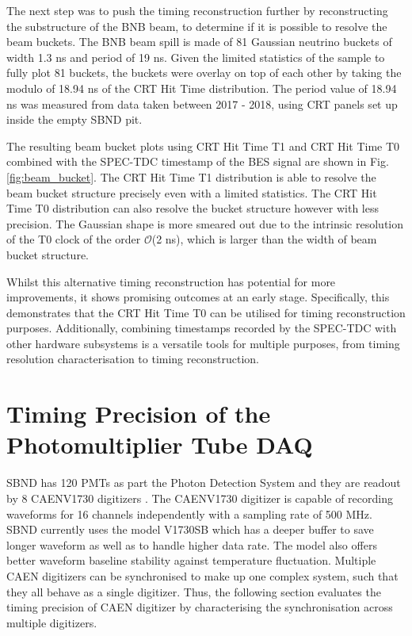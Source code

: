 The next step was to push the timing reconstruction further by reconstructing the substructure of the BNB beam, to determine if it is possible to resolve the beam buckets.
The BNB beam spill is made of 81 Gaussian neutrino buckets of width 1.3 ns and period of 19 ns.
Given the limited statistics of the sample to fully plot 81 buckets, the buckets were overlay on top of each other by taking the modulo of 18.94 ns of the CRT Hit Time distribution.
The period value of 18.94 ns was measured from data taken between 2017 - 2018, using CRT panels set up inside the empty SBND pit.

The resulting beam bucket plots using CRT Hit Time T1 and CRT Hit Time T0 combined with the SPEC-TDC timestamp of the BES signal are shown in Fig. \ref{fig:beam_bucket}.
The CRT Hit Time T1 distribution is able to resolve the beam bucket structure precisely even with a limited statistics.
The CRT Hit Time T0 distribution can also resolve the bucket structure however with less precision. 
The Gaussian shape is more smeared out due to the intrinsic resolution of the T0 clock of the order $\mathcal{O}$(2 ns), which is larger than the width of beam bucket structure.

Whilst this alternative timing reconstruction has potential for more improvements, it shows promising outcomes at an early stage.
Specifically, this demonstrates that the CRT Hit Time T0 can be utilised for timing reconstruction purposes. 
Additionally, combining timestamps recorded by the SPEC-TDC with other hardware subsystems is a versatile tools for multiple purposes, from timing resolution characterisation to timing reconstruction.

\section{Timing Precision of the Photomultiplier Tube DAQ}
\label{section5.4}

SBND has 120 PMTs as part the Photon Detection System and they are readout by 8 CAENV1730 digitizers \cite{caen_manuals}.
The CAENV1730 digitizer is capable of recording waveforms for 16 channels independently with a sampling rate of 500 MHz.
SBND currently uses the model V1730SB which has a deeper buffer to save longer waveform as well as to handle higher data rate.
The model also offers better waveform baseline stability against temperature fluctuation.
Multiple CAEN digitizers can be synchronised to make up one complex system, such that they all behave as a single digitizer.
Thus, the following section evaluates the timing precision of CAEN digitizer by characterising the synchronisation across multiple digitizers.

